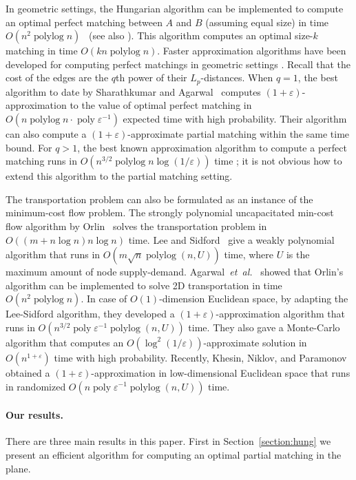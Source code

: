\documentclass[11pt]{article}
\def\etal{\emph{et~al.}}
\def\etal{\textit{et~al.}}
\def\poly{\mathop{\mathrm{poly}}}
\def\polylog{\mathop{\mathrm{polylog}}}
\def\eps{\varepsilon}
\theoremstyle{plain}
\numberwithin{figure}{section}
\begin{document}
In geometric settings, the Hungarian algorithm can be implemented to compute
an optimal perfect matching between $A$ and $B$ (assuming equal size)
in time $O(n^2\polylog n)$~\cite{KMRSS17} (see also \cite{Vaidya89,AES99}).
This algorithm computes an optimal size-$k$ matching in time $O(kn\polylog n)$.
Faster approximation algorithms have been developed for computing perfect
matchings in geometric settings \cite{Vaidya89,V98,AV04,SA12}.
Recall that the cost of the edges are the $q$th power of their $L_p$-distances.
When $q = 1$, the best algorithm to date by Sharathkumar and Agarwal~\cite{SA12m}
computes $(1+\eps)$-approximation to the value of optimal perfect matching in
$O(n\polylog n \cdot \poly\eps^{-1})$ expected time with high probability.
Their algorithm can also compute a $(1+\eps)$-approximate partial
matching within the same time bound.
For $q > 1$, the best known approximation algorithm to compute a perfect
matching runs in $O(n^{3/2}\polylog n \log(1/\eps))$ time \cite{SA12};
it is not obvious how to extend this algorithm to the partial matching setting.

The transportation problem can also be formulated as an instance of the
minimum-cost flow problem.
The strongly polynomial uncapacitated min-cost flow algorithm by
Orlin~\cite{O93} solves the transportation problem in
$O((m + n\log n) n\log n)$ time.
Lee and Sidford~\cite{LS14} give a weakly polynomial algorithm that runs in
$O(m\sqrt{n}\polylog(n, U))$ time, where $U$ is the maximum amount of node supply-demand.
Agarwal~\etal~\cite{AFPVX17, AFPVX17arxiv} showed that Orlin's algorithm can be
implemented to solve 2D transportation in time $O(n^2\polylog n)$.
In case of $O(1)$-dimension Euclidean space,
by adapting the Lee-Sidford algorithm, they developed a
$(1+\eps)$-approximation algorithm that runs in $O(n^{3/2} \poly\eps^{-1} \polylog(n, U))$ time.
They also gave a Monte-Carlo algorithm that computes an
$O(\log^2(1/\eps))$-approximate solution in $O(n^{1+\eps})$ time with
high probability.
Recently, Khesin, Niklov, and Paramonov~\cite{KNP19} obtained a
$(1+\eps)$-approximation in low-dimensional Euclidean space
that runs in randomized $O(n \poly\eps^{-1} \polylog(n, U))$ time. %

\paragraph*{Our results.}
There are three main results in this paper.
First in Section~\ref{section:hung} we present an efficient algorithm for
computing an optimal partial matching in the plane.
\end{document}
